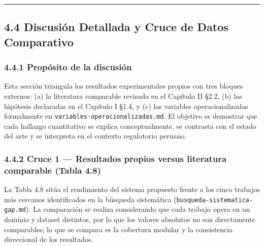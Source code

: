 \begin{center}\rule{0.5\linewidth}{0.5pt}\end{center}

\subsection{4.4 Discusión Detallada y Cruce de Datos
Comparativo}\label{discusiuxf3n-detallada-y-cruce-de-datos-comparativo}

\subsubsection{4.4.1 Propósito de la
discusión}\label{propuxf3sito-de-la-discusiuxf3n}

Esta sección triangula los resultados experimentales propios con tres
bloques externos: (a) la literatura comparable revisada en el Capítulo
II §2.2, (b) las hipótesis declaradas en el Capítulo I §1.4, y (c) las
variables operacionalizadas formalmente en
\texttt{variables-operacionalizadas.md}. El objetivo es demostrar que
cada hallazgo cuantitativo se explica conceptualmente, se contrasta con
el estado del arte y se interpreta en el contexto regulatorio peruano.

\subsubsection{4.4.2 Cruce 1 --- Resultados propios versus literatura
comparable (Tabla
4.8)}\label{cruce-1-resultados-propios-versus-literatura-comparable-tabla-4.8}

La Tabla 4.8 sitúa el rendimiento del sistema propuesto frente a los
cinco trabajos más cercanos identificados en la búsqueda sistemática
(\texttt{busqueda-sistematica-gap.md}). La comparación se realiza
considerando que cada trabajo opera en un dominio y dataset distintos,
por lo que los valores absolutos no son directamente comparables; lo que
se compara es la cobertura modular y la consistencia direccional de los
resultados.

